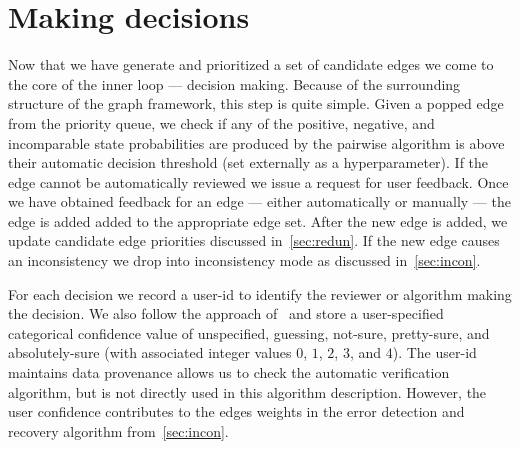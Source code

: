 \section{Making decisions}\label{sec:decision}

Now that we have generate and prioritized a set of candidate edges we come to the core of the inner loop ---
  decision making.
Because of the surrounding structure of the graph framework, this step is quite simple.
Given a popped edge from the priority queue, we check if any of the positive, negative, and incomparable state
  probabilities are produced by the pairwise algorithm is above their automatic decision threshold (set externally
  as a hyperparameter).
If the edge cannot be automatically reviewed we issue a request for user feedback.
Once we have obtained feedback for an edge --- either automatically or manually --- the edge is added added to
  the appropriate edge set.
After the new edge is added, we update candidate edge priorities discussed in~\cref{sec:redun}.
If the new edge causes an inconsistency we drop into inconsistency mode as discussed in~\cref{sec:incon}.

For each decision we record a user-id to identify the reviewer or algorithm making the decision.
We also follow the approach of~\cite{branson_visual_2010} and store a user-specified categorical confidence value
  of unspecified, guessing, not-sure, pretty-sure, and absolutely-sure (with associated integer values $0$, $1$,
  $2$, $3$, and $4$).
The user-id maintains data provenance allows us to check the automatic verification algorithm, but is not
  directly used in this algorithm description.
However, the user confidence contributes to the edges weights in the error detection and recovery algorithm
  from~\cref{sec:incon}.





